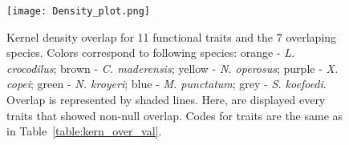 \begin{figure} [!htbp]
	\begin{center}
		\texttt{[image: Density\_plot.png]}
	\end{center}
	\caption[Kernel density distribution of overlapping species]{Kernel density overlap for 11 functional traits and the 7 overlaping species. Colors correspond to following species: orange - \textit{L. crocodilus}; brown - \textit{C. maderensis}; yellow - \textit{N. operosus}; purple - \textit{X. copei}; green - \textit{N. kroyeri}; blue - \textit{M. punctatum}; grey - \textit{S. koefoedi}. Overlap is represented by shaded lines. Here, are displayed every traits that showed non-null overlap. Codes for traits are the same as in Table~\ref{table:kern_over_val}.}
	\label{fig:dpo}
\end{figure}
